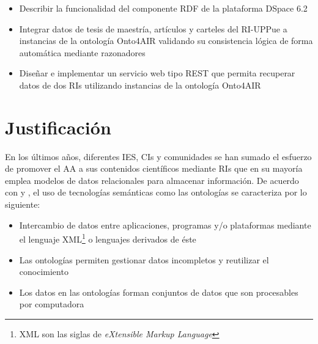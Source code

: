 \begin{itemize}

     \item Describir la funcionalidad del componente RDF de la plataforma DSpace 6.2 
     
     \item  Integrar datos de tesis de maestr\'ia, art\'iculos y carteles del RI-UPPue a instancias de la ontolog\'ia Onto4AIR validando su consistencia l\'ogica de forma autom\'atica mediante razonadores
     
     \item Dise\~{n}ar e implementar un servicio web tipo REST que permita recuperar datos de dos RIs utilizando instancias de la ontolog\'ia Onto4AIR
    
   \end{itemize}
   


\section{Justificaci\'on}

En los \'ultimos a\~{n}os, diferentes IES, CIs y comunidades se han sumado el esfuerzo de promover el AA a sus contenidos cient\'ificos mediante RIs que en su mayor\'ia emplea modelos de datos relacionales para almacenar informaci\'on. De acuerdo con \cite{ASWebQuest}  y \cite{GuideCreatingOntology}, el uso de tecnolog\'ias sem\'anticas como las ontolog\'ias se caracteriza por lo siguiente: 

\begin{itemize}
\item Intercambio de datos entre aplicaciones, programas y/o plataformas mediante el lenguaje XML\footnote{XML son las siglas de \textit{eXtensible Markup Language}}  o lenguajes derivados de \'este
\item Las ontolog\'ias permiten gestionar datos incompletos y reutilizar el conocimiento 
\item Los datos en las ontolog\'ias forman conjuntos de datos que son procesables por computadora

\end{itemize}

